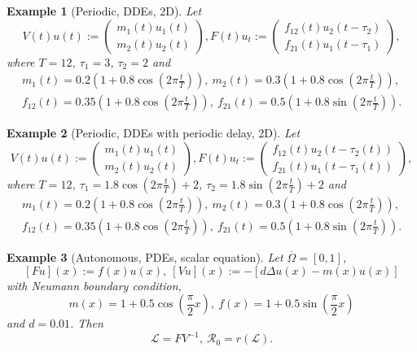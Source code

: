 \documentclass[12pt,reqno]{article}
\newtheorem{example}{Example}
\newcommand{\oOmega}{\overline{\Omega}}
\newcommand{\cL}{\mathcal{L}}
\newcommand{\R}{\mathcal{R}_0}
\begin{document}
\begin{example}[Periodic, DDEs, 2D] Let
	$$V(t) u(t):=
	\left(
	\begin{matrix}
	m_1 (t) u_1(t) \\
	m_2(t) u_2(t)
	\end{matrix}
	\right),
	F(t) u_t:=
	\left(
	\begin{matrix}
	f_{12} (t) u_2(t-\tau_2)\\
	f_{21} (t) u_1(t-\tau_1)
	\end{matrix}
	\right),
	$$ where $T=12$, $\tau_1=3$, $\tau_2=2$ and
	$$
\begin{aligned}
m_1(t)= 0.2(1+0.8\cos(2\pi \frac{t}{T})),~
m_2(t)= 0.3(1+0.8\cos(2\pi \frac{t}{T})),\\
f_{12}(t)=0.35(1+0.8\cos(2\pi \frac{t}{T})),~
f_{21}(t)=0.5(1+0.8\sin(2\pi \frac{t}{T})).
\end{aligned}
$$
\end{example}


\begin{example}[Periodic, DDEs with periodic delay, 2D] Let
	$$V(t) u(t):=
	\left(
	\begin{matrix}
	m_1 (t) u_1(t) \\
	m_2(t) u_2(t)
	\end{matrix}
	\right),
	F(t) u_t:=
	\left(
	\begin{matrix}
	f_{12} (t) u_2(t-\tau_2(t))\\
	f_{21} (t) u_1(t-\tau_1(t))
	\end{matrix}
	\right),
	$$ where $T=12$, $\tau_1=1.8\cos(2\pi \frac{t}{T})+2$, $\tau_2=1.8\sin(2\pi \frac{t}{T})+2$ and
	$$
	\begin{aligned}
	m_1(t)= 0.2(1+0.8\cos(2\pi \frac{t}{T})),~
	m_2(t)= 0.3(1+0.8\cos(2\pi \frac{t}{T})),\\
	f_{12}(t)=0.35(1+0.8\cos(2\pi \frac{t}{T})),~
	f_{21}(t)=0.5(1+0.8\sin(2\pi \frac{t}{T})).
	\end{aligned}
	$$
\end{example}

\begin{example}[Autonomous, PDEs, scalar equation] Let $\oOmega=[0,1]$,
	$$[F u](x) := f(x) u(x),~ [V u](x) := -[ d \Delta u(x) - m(x) u(x)]$$ with Neumann boundary condition, $$m(x)=1+0.5\cos(\frac{\pi}{2} x),~ f(x)=1 +0.5 \sin(\frac{\pi}{2} x)$$ and $d=0.01$.
	Then
	$$
	\cL=FV^{-1},~
	\R=r(\cL).
	$$
\end{example}
\end{document}
